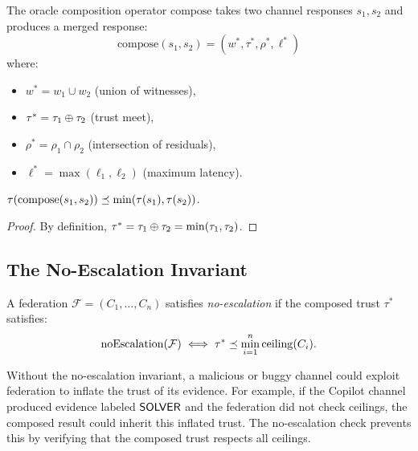 \documentclass[11pt]{article}
\newcommand{\OracleComp}{\mathrm{compose}}
\newcommand{\TrustCeil}{\mathrm{ceiling}}
\newcommand{\NoEscal}{\mathrm{noEscalation}}
\begin{document}
\begin{definition}
\label{def:oracle-comp}
The oracle composition operator $\OracleComp$ takes two channel
responses $s_1, s_2$ and produces a merged response:
\[
  \OracleComp(s_1, s_2) = (w^*, \tau^*, \rho^*, \ell^*)
\]
where:
\begin{itemize}[leftmargin=2em]
\item $w^* = w_1 \cup w_2$ (union of witnesses),
\item $\tau^* = \tau_1 \oplus \tau_2$ (trust meet),
\item $\rho^* = \rho_1 \cap \rho_2$ (intersection of residuals),
\item $\ell^* = \max(\ell_1, \ell_2)$ (maximum latency).
\end{itemize}
\end{definition}

\begin{lemma}
\label{lem:comp-trust}
$\tau(\OracleComp(s_1, s_2)) \tleq \min(\tau(s_1), \tau(s_2))$.
\end{lemma}

\begin{proof}
By definition, $\tau^* = \tau_1 \oplus \tau_2 = \min(\tau_1, \tau_2)$.
\end{proof}

\subsection{The No-Escalation Invariant}
\label{sec:oracle:noescal}

\begin{definition}
\label{def:no-escal}
A federation $\mathcal{F} = (C_1, \ldots, C_n)$ satisfies
\emph{no-escalation} if the composed trust $\tau^*$ satisfies:
\[
  \NoEscal(\mathcal{F}) \iff
  \tau^* \tleq \min_{i=1}^{n} \TrustCeil(C_i).
\]
\end{definition}

\begin{remark}
\label{rem:why-noescal}
Without the no-escalation invariant, a malicious or buggy channel
could exploit federation to inflate the trust of its evidence.
For example, if the Copilot channel produced evidence labeled
$\mathsf{SOLVER}$ and the federation did not check ceilings, the
composed result could inherit this inflated trust.  The
no-escalation check prevents this by verifying that the composed
trust respects all ceilings.
\end{remark}
\end{document}
